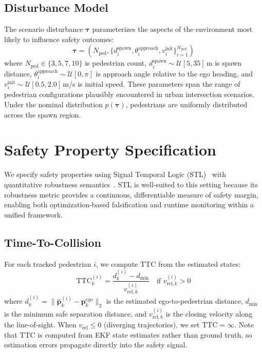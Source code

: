 \documentclass[conference]{IEEEtran}
\begin{document}
\subsection{Disturbance Model}

The scenario disturbance $\boldsymbol{\tau}$ parameterizes the aspects of the environment most likely to influence safety outcomes:
\begin{equation}
    \boldsymbol{\tau} = (N_{\text{ped}}, \{d_i^{\text{spawn}}, \theta_i^{\text{approach}}, v_i^{\text{init}}\}_{i=1}^{N_{\text{ped}}})
    \label{eq:disturbance}
\end{equation}
where $N_{\text{ped}} \in \{3,5,7,10\}$ is pedestrian count, $d_i^{\text{spawn}} \sim \mathcal{U}[5, 35]$\,m is spawn distance, $\theta_i^{\text{approach}} \sim \mathcal{U}[0, \pi]$ is approach angle relative to the ego heading, and $v_i^{\text{init}} \sim \mathcal{U}[0.5, 2.0]$\,m/s is initial speed. These parameters span the range of pedestrian configurations plausibly encountered in urban intersection scenarios. Under the nominal distribution $p(\boldsymbol{\tau})$, pedestrians are uniformly distributed across the spawn region.

\section{Safety Property Specification}
\label{sec:stl}

We specify safety properties using Signal Temporal Logic (STL)~\cite{maler2004stl} with quantitative robustness semantics~\cite{donze2010robust}. STL is well-suited to this setting because its robustness metric provides a continuous, differentiable measure of safety margin, enabling both optimization-based falsification and runtime monitoring within a unified framework.

\subsection{Time-To-Collision}

For each tracked pedestrian $i$, we compute TTC from the estimated states:
\begin{equation}
    \mathrm{TTC}_k^{(i)} = \frac{d_k^{(i)} - d_{\min}}{v_{\text{rel},k}^{(i)}} \quad \text{if } v_{\text{rel},k}^{(i)} > 0
    \label{eq:ttc}
\end{equation}
where $d_k^{(i)} = \|\hat{\mathbf{p}}_k^{(i)} - \mathbf{p}_k^{\text{ego}}\|_2$ is the estimated ego-to-pedestrian distance, $d_{\min}$ is the minimum safe separation distance, and $v_{\text{rel},k}^{(i)}$ is the closing velocity along the line-of-sight. When $v_{\text{rel}} \leq 0$ (diverging trajectories), we set $\mathrm{TTC} = \infty$. Note that TTC is computed from EKF state estimates rather than ground truth, so estimation errors propagate directly into the safety signal.
\end{document}
